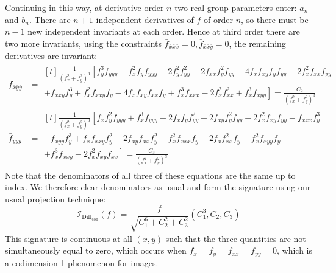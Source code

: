 \documentclass[review,onefignum,onetabnum]{siamonline190516}
\begin{document}
Continuing in this way, at derivative order $n$ two real group parameters
enter: $a_n$ and $b_n$. There are $n+1$ independent derivatives of $f$ of
order $n$, so there must be $n-1$ new independent invariants at each order.
Hence at third order there are two more invariants, using the constraints
$\bar{f}_{\bar{x}\bar{x}\bar{x}} = 0, \bar{f}_{\bar{x}\bar{x}\bar{y}} = 0$,
the remaining derivatives are invariant:
\begin{align}
    \bar{f}_{\bar{x}\bar{y}\bar{y}} &= 
    \begin{multlined}[t]
        \frac{1}{(f_x^2 + f_y^2)^3} \left[
f_y^3f_{yyy} + f_x^2f_yf_{yyy}
            -2f_y^2f_{yy}^2 - 2f_{xx}f_y^2f_{yy} -
            4f_xf_{xy}f_yf_{yy} - 2f_x^2 f_{xx}f_{yy} \right. \\ 
+ \left. f_{xxy}f_y^3 +
            f_x^2 f_{xxy}f_y - 4 f_x f_{xy} f_{xx} f_y + f_x^3 f_{xxx} -
    2f_x^2 f_{xx}^2 + f_x^3 f_{xyy} \right]
    = \frac{C_2}{(f_x^2 +
f_y^2)^3}\end{multlined} \\
    \bar{f}_{\bar{y}\bar{y}\bar{y}} &= 
    \begin{multlined}[t]
        \frac{1}{(f_x^2 + f_y^2)^3} \left[
f_xf_y^2f_{yyy} +
        f_x^3f_{yyy} - 2f_x f_y f_{yy}^2 + 2f_{xy}f_y^2f_{yy} -
    2f_x^2f_{xy}f_{yy} - f_{xxx}f_y^3 \right. \\ 
-  f_{xyy}f_y^3 + f_xf_{xxy}f_y^2 +
2f_{xy}f_{xx}f_y^2 - f_x^2 f_{xxx} f_y + 2f_xf_{xx}^2 f_y - f_x^2 f_{xyy}
f_y \\\left.+ f_x^3 f_{xxy} - 2f_x^2 f_{xy} f_{xx}\right]
= \frac{C_3}{(f_x^2 + f_y^2)^3}
\end{multlined}\label{eqn:C3}
\end{align}
Note that the denominators of all three of these equations are the same up
to index. We therefore clear denominators as usual and form the
signature using our usual projection technique:
\begin{equation}
    \label{eq:conformalsignature}
\mathcal{I}_{\text{Diff}_\text{con}}(f) = \frac{f}{\sqrt{C_1^6 + C_2^2 +
C_3^2}}(C_1^3, C_2, C_3)
\end{equation}
This signature is continuous at all $(x,y)$ such that the three quantities
are not simultaneously equal to zero, which occurs when $f_x = f_y = f_{xx}
= f_{yy} = 0$, which is a codimension-1 phenomenon for images.
\end{document}
